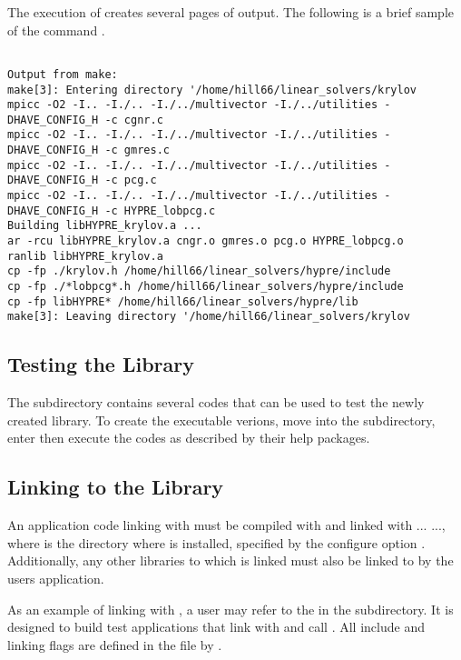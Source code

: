 The execution of  creates several pages of output.  The following is a brief 
sample of the command .
\begin{verbatim}

Output from make:
make[3]: Entering directory '/home/hill66/linear_solvers/krylov
mpicc -O2 -I.. -I./.. -I./../multivector -I./../utilities -DHAVE_CONFIG_H -c cgnr.c
mpicc -O2 -I.. -I./.. -I./../multivector -I./../utilities -DHAVE_CONFIG_H -c gmres.c
mpicc -O2 -I.. -I./.. -I./../multivector -I./../utilities -DHAVE_CONFIG_H -c pcg.c
mpicc -O2 -I.. -I./.. -I./../multivector -I./../utilities -DHAVE_CONFIG_H -c HYPRE_lobpcg.c
Building libHYPRE_krylov.a ...
ar -rcu libHYPRE_krylov.a cngr.o gmres.o pcg.o HYPRE_lobpcg.o
ranlib libHYPRE_krylov.a
cp -fp ./krylov.h /home/hill66/linear_solvers/hypre/include
cp -fp ./*lobpcg*.h /home/hill66/linear_solvers/hypre/include
cp -fp libHYPRE* /home/hill66/linear_solvers/hypre/lib
make[3]: Leaving directory '/home/hill66/linear_solvers/krylov

\end{verbatim}


\subsection{Testing the Library} 

The  subdirectory contains several codes that can be used to test
the newly created \hypre{} library.  To create the executable verions, move into
the  subdirectory, enter  then execute the codes as described
by their help packages.



\subsection{Linking to the Library}

An application code linking with \hypre{} must be compiled with  
and linked with ... 
..., where  is the
directory where \hypre{} is installed, specified by the configure
option .  Additionally, any other libraries to which \hypre{} 
is linked must also be linked to by the users application. 

As an example of linking with \hypre{}, a user may refer to the  in the 
 subdirectory.  It is designed to build test applications that link with and 
call \hypre{}.  All include and linking flags are defined in the  
file by .


